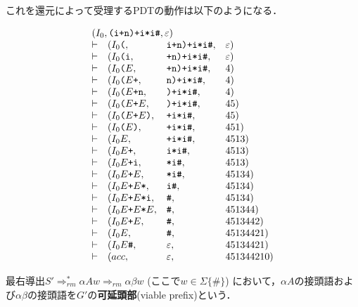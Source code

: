 \documentclass[a4j,dvipdfmx]{jbook}
\begin{document}
\begin{Exmp}
これを還元によって受理するPDTの動作は以下のようになる．

  \[\begin{array}{clll}
    \multicolumn{4}{l}{(I_0,\texttt{(i+n)+i*i\#},\varepsilon)}\\
    \vdash & (I_0\texttt{(},& \texttt{i+n)+i*i\#}, & \varepsilon)\\
    \vdash & (I_0\texttt{(i},& \texttt{+n)+i*i\#}, & \varepsilon)\\
    \vdash & (I_0\texttt{(}E,& \texttt{+n)+i*i\#}, & 4)\\
    \vdash & (I_0\texttt{(}E\texttt{+},& \texttt{n)+i*i\#}, & 4)\\
    \vdash & (I_0\texttt{(}E\texttt{+n},& \texttt{)+i*i\#}, & 4)\\
    \vdash & (I_0\texttt{(}E\texttt{+}E,& \texttt{)+i*i\#}, & 45)\\
    \vdash & (I_0\texttt{(}E\texttt{+}E\texttt{)},& \texttt{+i*i\#}, & 45)\\
    \vdash & (I_0\texttt{(}E\texttt{)},& \texttt{+i*i\#}, & 451)\\
    \vdash & (I_0E,& \texttt{+i*i\#}, & 4513)\\
    \vdash & (I_0E\texttt{+},& \texttt{i*i\#}, & 4513)\\
    \vdash & (I_0E\texttt{+i},& \texttt{*i\#}, & 4513)\\
    \vdash & (I_0E\texttt{+}E,& \texttt{*i\#}, & 45134)\\
    \vdash & (I_0E\texttt{+}E\texttt{*},& \texttt{i\#}, & 45134)\\
    \vdash & (I_0E\texttt{+}E\texttt{*i},& \texttt{\#}, & 45134)\\
    \vdash & (I_0E\texttt{+}E\texttt{*}E,& \texttt{\#}, & 451344)\\
    \vdash & (I_0E\texttt{+}E,& \texttt{\#}, & 4513442)\\
    \vdash & (I_0E,& \texttt{\#}, & 45134421)\\
    \vdash & (I_0E\texttt{\#},& \varepsilon, & 45134421)\\
    \vdash & (acc,& \varepsilon, & 451344210)\\
  \end{array}\]
\end{Exmp}

\begin{Def}
  最右導出$S'\Rightarrow_{rm}^\ast\alpha A w\Rightarrow_{rm}\alpha\beta w$ (ここで$w\in\Sigma\{\texttt{\#}\}$) 
  において，$\alpha A$の接頭語および$\alpha\beta$の接頭語を$G'$の{\bf 可延頭部}(viable prefix)という．
\end{Def}
\end{document}
